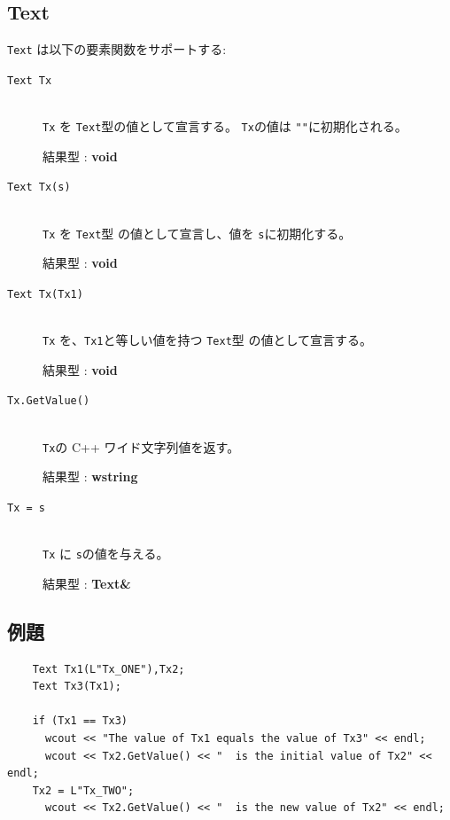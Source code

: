 \documentclass[\pformat,12pt]{jarticle}
\begin{document}
\subsection{Text}
{\tt Text} は以下の要素関数をサポートする:

\vspace{0.5cm}

\begin{description}
\item[{\tt Text Tx}] \mbox{}\\
      {\tt Tx} を {\tt Text}型の値として宣言する。 {\tt Tx}の値は {\tt ""}に初期化される。

     結果型 : {\bf void}

\item[{\tt Text Tx(s)}] \mbox{}\\
      {\tt Tx} を {\tt Text}型 の値として宣言し、値を {\tt s}に初期化する。

     結果型 : {\bf void}

\item[{\tt Text Tx(Tx1)}] \mbox{}\\
      {\tt Tx} を、{\tt Tx1}と等しい値を持つ {\tt Text}型 の値として宣言する。

     結果型 : {\bf void}

\item[{\tt Tx.GetValue()}] \mbox{}\\
      {\tt Tx}の C++ ワイド文字列値を返す。

     結果型 : {\bf wstring}

\item[{\tt Tx = s}] \mbox{}\\
     {\tt Tx} に {\tt s}の値を与える。

     結果型 : {\bf Text\&}
\end{description}

\subsection*{例題}

\begin{verbatim}
    Text Tx1(L"Tx_ONE"),Tx2;
    Text Tx3(Tx1);

    if (Tx1 == Tx3)
      wcout << "The value of Tx1 equals the value of Tx3" << endl;
      wcout << Tx2.GetValue() << "  is the initial value of Tx2" << endl;
    Tx2 = L"Tx_TWO";
      wcout << Tx2.GetValue() << "  is the new value of Tx2" << endl;
\end{verbatim}
\end{document}
